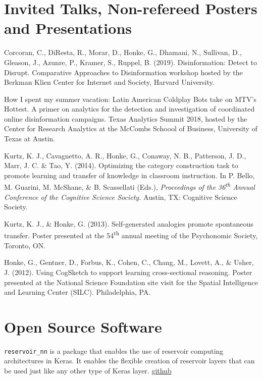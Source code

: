 \documentclass[11pt,]{article}
\begin{document}
\section{Invited Talks, Non-refereed Posters and
Presentations}\label{invited-talks-non-refereed-posters-and-presentations}

Corcoran, C., DiResta, R., Morar, D., Honke, G., Dhamani, N., Sullivan,
D., Gleason, J., Azunre, P., Kramer, S., Ruppel, B. (2019).
Disinformation: Detect to Disrupt. Comparative Approaches to
Disinformation workshop hosted by the Berkman Klien Center for Internet
and Society, Harvard University.

How I spent my summer vacation: Latin American Coldplay Bots take on
MTV's Hottest. A primer on analytics for the detection and investigation
of coordinated online disinformation campaigns. Texas Analytics Summit
2018, hosted by the Center for Research Analytics at the McCombs Schoool
of Business, University of Texas at Austin.

Kurtz, K. J., Cavagnetto, A. R., Honke, G., Conaway, N. B., Patterson,
J. D., Marr, J. C. \& Tao, Y. (2014). Optimizing the category
construction task to promote learning and transfer of knowledge in
classroom instruction. In P. Bello, M. Guarini, M. McShane, \& B.
Scassellati (Eds.), \emph{Proceedings of the 36\textsuperscript{th}
Annual Conference of the Cognitive Science Society.} Austin, TX:
Cognitive Science Society.

Kurtz, K. J., \& Honke, G. (2013). Self-generated analogies promote
spontaneous transfer. Poster presented at the 54\textsuperscript{th}
annual meeting of the Psychonomic Society, Toronto, ON.

Honke, G., Gentner, D., Forbus, K., Cohen, C., Chang, M., Lovett, A., \&
Usher, J. (2012). Using CogSketch to support learning cross-sectional
reasoning. Poster presented at the National Science Foundation site
visit for the Spatial Intelligence and Learning Center (SILC).
Philadelphia, PA.

\section{Open Source Software}\label{open-source-software}

\texttt{reservoir\_nn} is a package that enables the use of reservoir
computing architectures in Keras. It enables the flexible creation of
reservoir layers that can be used just like any other type of Keras
layer. \href{https://github.com/keras-team/reservoir_nn}{github}
\end{document}
